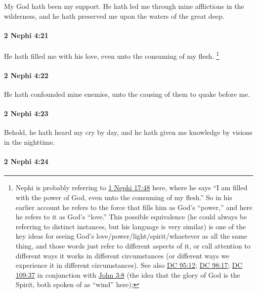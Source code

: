 			My God hath been my support.
			He hath led me through mine afflictions in the wilderness,
			and he hath preserved me upon the waters of the great deep.

		\paragraph{2 Nephi 4:21} %
			\label{2NEPHI-4-21}

			He hath filled me with his love,
			even unto the consuming of my flesh.%
				\footnote{%
					Nephi is probably referring to \hyperref[1NEPHI-17-48]{1 Nephi 17:48} here, where he says ``I am filled with the power of God, even unto the consuming of my flesh.'' So in his earlier account he refers to the force that fills him as God's ``power,'' and here he refers to it as God's ``love.'' This possible equivalence (he could always be referring to distinct instances, but his language is very similar) is one of the key ideas for seeing God's love/power/light/spirit/whaetever as all the same thing, and those words just refer to different aspects of it, or call attention to different ways it works in different circumstances (or different ways we experience it in different circumstances). See also \hyperref[DC95-12]{DC 95:12}; \hyperref[DC98-17]{DC 98:17}; \hyperref[DC109-37]{DC 109:37} in conjunction with \hyperref[JOHN-3-8]{John 3:8} (the idea that the glory of God is the Spirit, both spoken of as ``wind'' here); 
					}

		\paragraph{2 Nephi 4:22} %
			\label{2NEPHI-4-22}

			He hath confounded mine enemies,
			unto the causing of them to quake before me.

		\paragraph{2 Nephi 4:23} %
			\label{2NEPHI-4-23}

			Behold, he hath heard my cry by day,
			and he hath given me knowledge by visions in the nighttime.

		\paragraph{2 Nephi 4:24} %
			\label{2NEPHI-4-24}


